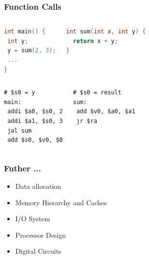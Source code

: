 \documentclass[xcolor={table, dvipsnames}]{beamer}
\begin{document}
\begin{frame}[fragile]
\frametitle{Function Calls}
\begin{columns}
 \begin{lstlisting}[language=C,  basicstyle=\ttfamily,keywordstyle=\color{blue}]     
int main() {
 int y;
 y = sum(2, 3);
 ...
}
   \end{lstlisting}
 \begin{lstlisting}[language=C,  basicstyle=\ttfamily,keywordstyle=\color{blue}]     
int sum(int x, int y) {
  return x + y;
}
   \end{lstlisting}
\end{columns} \pause

\begin{columns}
 \begin{lstlisting}[basicstyle=\ttfamily,keywordstyle=\color{blue}]     
# $s0 = y
main:
 addi $a0, $s0, 2
 addi $a1, $s0, 3
 jal sum
 add $s0, $v0, $0
   \end{lstlisting}
 \begin{lstlisting}[basicstyle=\ttfamily,keywordstyle=\color{blue}]     
# $s0 = result
sum:
 add $v0, $a0, $a1
 jr $ra
   \end{lstlisting}
\end{columns}
\end{frame}

\begin{frame}
\frametitle{Futher ...}
\begin{itemize}
\item Data allocation
\item Memory Hierarchy and Caches
\item I/O System
\item Processor Design
\item Digital Circuits
\end{itemize}
\end{frame}
\end{document}
